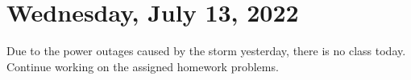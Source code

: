\section{Wednesday, July 13, 2022}
Due to the power outages caused by the storm yesterday, there is no class today. Continue working on the assigned homework problems.